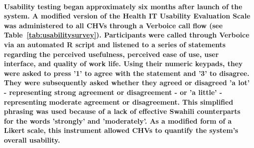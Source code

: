 \paragraph{Usability testing began approximately six months after launch of the system. A modified version of the Health IT Usability Evaluation Scale \citep{Yen2010} was administered to all CHVs through a Verboice call flow (see Table~\ref{tab:usabilitysurvey}). Participants were called through Verboice via an automated R script and listened to a series of statements regarding the perceived usefulness, perceived ease of use, user interface, and quality of work life. Using their numeric keypads, they were asked to press '1' to agree with the statement and '3' to disagree. They were subsequently asked whether they agreed or disagreed 'a lot' - representing strong agreement or disagreement -  or 'a little' - representing moderate agreement or disagreement. This simplified phrasing was used because of a lack of effective Swahili counterparts for the words 'strongly' and 'moderately'. As a modified form of a Likert scale, this instrument allowed CHVs to quantify the system's overall usability.}




